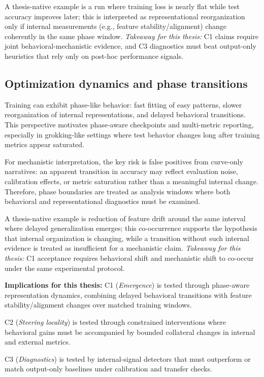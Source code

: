 \documentclass[../ppgc-tese.tex]{subfiles}
\begin{document}
    A thesis-native example is a run where training loss is nearly flat while test accuracy improves later; this is interpreted as representational reorganization only if internal measurements (e.g., feature stability/alignment) change coherently in the same phase window. \textit{Takeaway for this thesis:} C1 claims require joint behavioral-mechanistic evidence, and C3 diagnostics must beat output-only heuristics that rely only on post-hoc performance signals.

    \subsection{Optimization dynamics and phase transitions}
Training can exhibit phase-like behavior: fast fitting of easy patterns, slower reorganization of internal representations, and delayed behavioral transitions. This perspective motivates phase-aware checkpoints and multi-metric reporting, especially in grokking-like settings where test behavior changes long after training metrics appear saturated.

For mechanistic interpretation, the key risk is false positives from curve-only narratives: an apparent transition in accuracy may reflect evaluation noise, calibration effects, or metric saturation rather than a meaningful internal change. Therefore, phase boundaries are treated as analysis windows where both behavioral and representational diagnostics must be examined.

A thesis-native example is reduction of feature drift around the same interval where delayed generalization emerges; this co-occurrence supports the hypothesis that internal organization is changing, while a transition without such internal evidence is treated as insufficient for a mechanistic claim. \textit{Takeaway for this thesis:} C1 acceptance requires behavioral shift and mechanistic shift to co-occur under the same experimental protocol.

\textbf{Implications for this thesis:}
C1 (\emph{Emergence}) is tested through phase-aware representation dynamics, combining delayed behavioral transitions with feature stability/alignment changes over matched training windows.

C2 (\emph{Steering locality}) is tested through constrained interventions where behavioral gains must be accompanied by bounded collateral changes in internal and external metrics.

C3 (\emph{Diagnostics}) is tested by internal-signal detectors that must outperform or match output-only baselines under calibration and transfer checks.
\end{document}
